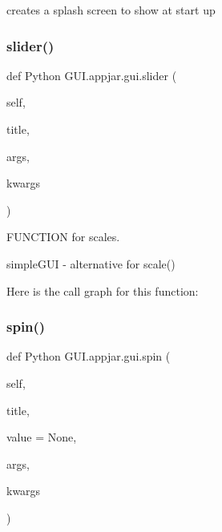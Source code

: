 \begin{DoxyVerb}
\begin{DoxyVerb}creates a splash screen to show at start up \end{DoxyVerb}
 \mbox{\label{class_python_01_g_u_i_1_1appjar_1_1gui_af601e0be18cecae7abee6e159e45338a}} 
\subsubsection{\texorpdfstring{slider()}{slider()}}
{\footnotesize\ttfamily def Python G\+U\+I.\+appjar.\+gui.\+slider (\begin{DoxyParamCaption}\item[{}]{self,  }\item[{}]{title,  }\item[{}]{args,  }\item[{}]{kwargs }\end{DoxyParamCaption})}



F\+U\+N\+C\+T\+I\+ON for scales. 

\begin{DoxyVerb}simpleGUI - alternative for scale() \end{DoxyVerb}
 Here is the call graph for this function\+:
\mbox{\label{class_python_01_g_u_i_1_1appjar_1_1gui_a417543438f35a2b478c36a725dcb0db4}} 
\subsubsection{\texorpdfstring{spin()}{spin()}}
{\footnotesize\ttfamily def Python G\+U\+I.\+appjar.\+gui.\+spin (\begin{DoxyParamCaption}\item[{}]{self,  }\item[{}]{title,  }\item[{}]{value = {\ttfamily None},  }\item[{}]{args,  }\item[{}]{kwargs }\end{DoxyParamCaption})}




\end{DoxyVerb}
